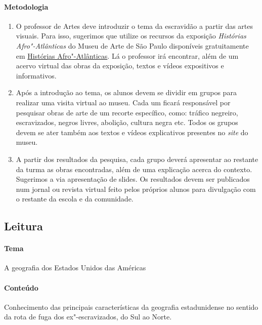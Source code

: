 \documentclass[12pt]{extarticle}
\begin{document}
 \paragraph{Metodologia}
   \begin{enumerate}
    \item
    O professor de Artes deve introduzir o tema da escravidão a partir das 
    artes visuais. Para isso, sugerimos que utilize os recursos da exposição
    \emph{Histórias Afro"-Atlânticas} do Museu de Arte de São Paulo disponíveis 
    gratuitamente em \href{https://masp.org.br/exposicoes/historias-afro-atlanticas}{Histórias Afro"-Atlânticas}.
    Lá o professor irá encontrar, além de um acervo virtual das obras da exposição,
    textos e vídeos expositivos e informativos.

    \item
    Após a introdução ao tema, os alunos
    devem se dividir em grupos para realizar uma visita virtual ao museu. 
    Cada um ficará responsável por pesquisar obras de arte de um recorte específico,
    como: tráfico negreiro, escravizados, negros livres, abolição, cultura negra etc.
    Todos os grupos devem se ater também aos textos e vídeos explicativos presentes 
    no \emph{site} do museu.

    \item
    A partir dos resultados da pesquisa, cada grupo deverá apresentar ao
    restante da turma as obras encontradas, 
    além de uma explicação acerca do contexto. Sugerimos a via apresentação de slides. Os resultados devem ser publicados
    num jornal ou revista virtual feito pelos próprios alunos para divulgação
    com o restante da escola e da comunidade.
  \end{enumerate}
 
\subsection{Leitura}

 \paragraph{Tema} A geografia dos Estados Unidos das Américas

 \paragraph{Conteúdo} Conhecimento das principais características
 da geografia estadunidense no sentido da rota de fuga dos ex"-escravizados,
 do Sul ao Norte. 
\end{document}
